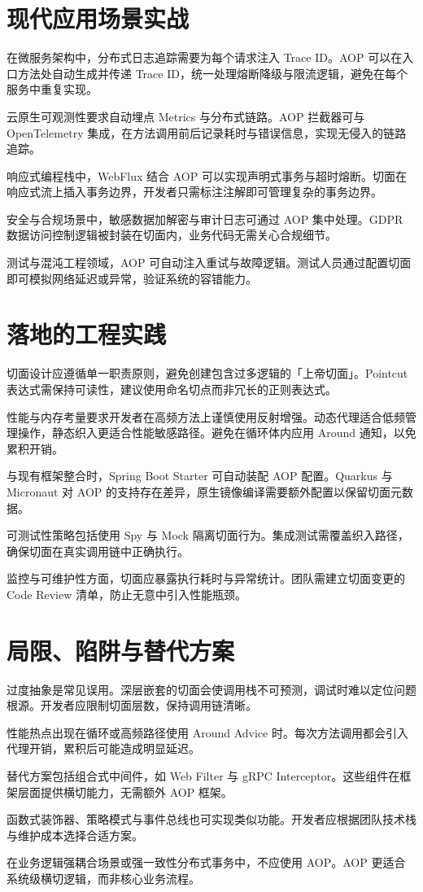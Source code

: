 \chapter{现代应用场景实战}
在微服务架构中，分布式日志追踪需要为每个请求注入 Trace ID。AOP 可以在入口方法处自动生成并传递 Trace ID，统一处理熔断降级与限流逻辑，避免在每个服务中重复实现。\par
云原生可观测性要求自动埋点 Metrics 与分布式链路。AOP 拦截器可与 OpenTelemetry 集成，在方法调用前后记录耗时与错误信息，实现无侵入的链路追踪。\par
响应式编程栈中，WebFlux 结合 AOP 可以实现声明式事务与超时熔断。切面在响应式流上插入事务边界，开发者只需标注注解即可管理复杂的事务边界。\par
安全与合规场景中，敏感数据加解密与审计日志可通过 AOP 集中处理。GDPR 数据访问控制逻辑被封装在切面内，业务代码无需关心合规细节。\par
测试与混沌工程领域，AOP 可自动注入重试与故障逻辑。测试人员通过配置切面即可模拟网络延迟或异常，验证系统的容错能力。\par
\chapter{落地的工程实践}
切面设计应遵循单一职责原则，避免创建包含过多逻辑的「上帝切面」。Pointcut 表达式需保持可读性，建议使用命名切点而非冗长的正则表达式。\par
性能与内存考量要求开发者在高频方法上谨慎使用反射增强。动态代理适合低频管理操作，静态织入更适合性能敏感路径。避免在循环体内应用 Around 通知，以免累积开销。\par
与现有框架整合时，Spring Boot Starter 可自动装配 AOP 配置。Quarkus 与 Micronaut 对 AOP 的支持存在差异，原生镜像编译需要额外配置以保留切面元数据。\par
可测试性策略包括使用 Spy 与 Mock 隔离切面行为。集成测试需覆盖织入路径，确保切面在真实调用链中正确执行。\par
监控与可维护性方面，切面应暴露执行耗时与异常统计。团队需建立切面变更的 Code Review 清单，防止无意中引入性能瓶颈。\par
\chapter{局限、陷阱与替代方案}
过度抽象是常见误用。深层嵌套的切面会使调用栈不可预测，调试时难以定位问题根源。开发者应限制切面层数，保持调用链清晰。\par
性能热点出现在循环或高频路径使用 Around Advice 时。每次方法调用都会引入代理开销，累积后可能造成明显延迟。\par
替代方案包括组合式中间件，如 Web Filter 与 gRPC Interceptor。这些组件在框架层面提供横切能力，无需额外 AOP 框架。\par
函数式装饰器、策略模式与事件总线也可实现类似功能。开发者应根据团队技术栈与维护成本选择合适方案。\par
在业务逻辑强耦合场景或强一致性分布式事务中，不应使用 AOP。AOP 更适合系统级横切逻辑，而非核心业务流程。\par
